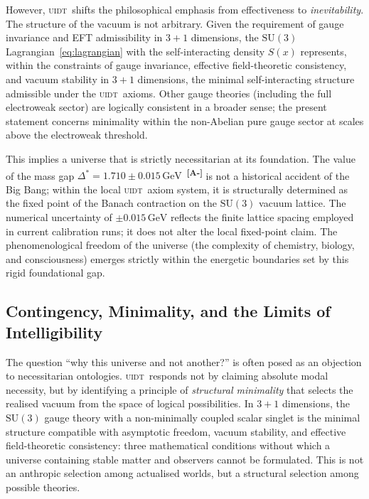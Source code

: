 \documentclass[12pt,a4paper,twoside]{article}
\theoremstyle{plain}
\theoremstyle{definition}
\theoremstyle{remark}
\newcommand{\UIDT}{\textsc{uidt}}
\newcommand{\GeV}{\,\mathrm{GeV}}
\newcommand{\catmark}[1]{\textsuperscript{\textsf{\textbf{[#1]}}}}
\newcommand{\Sx}{S(x)}
\newcommand{\DeltaGap}{1.710 \pm 0.015\GeV}        %
\begin{document}
However, \UIDT\ shifts the philosophical emphasis from effectiveness to
\emph{inevitability}. The structure of the vacuum is not arbitrary. Given the
requirement of gauge invariance and EFT admissibility in $3+1$ dimensions, the $\mathrm{SU}(3)$ Lagrangian~\eqref{eq:lagrangian} with the self-interacting
density $\Sx$ represents, within the constraints of gauge
invariance, effective field-theoretic consistency, and vacuum stability in $3+1$
dimensions, the minimal self-interacting structure admissible under the \UIDT\
axioms.  Other gauge theories (including the full electroweak sector) are
logically consistent in a broader sense; the present statement concerns
minimality within the non-Abelian pure gauge sector at scales above the
electroweak threshold.

This implies a universe that is strictly necessitarian at its foundation. The
value of the mass gap $\Delta^{*} = \DeltaGap$~\catmark{A-} is not a historical
accident of the Big Bang; within the local \UIDT\ axiom system, it is
structurally determined as the fixed point of the Banach contraction on the
$\mathrm{SU}(3)$ vacuum lattice. The numerical uncertainty of $\pm 0.015\GeV$
reflects the finite lattice spacing employed in current calibration runs; it
does not alter the local fixed-point claim.
The phenomenological freedom of the universe (the complexity of chemistry,
biology, and consciousness) emerges strictly within the energetic boundaries
set by this rigid foundational gap.

\subsection{Contingency, Minimality, and the Limits of Intelligibility}
\label{subsec:contingency}

The question ``why this universe and not another?'' is often posed as an
objection to necessitarian ontologies. \UIDT\ responds not by claiming
absolute modal necessity, but by identifying a principle of \emph{structural
minimality} that selects the realised vacuum from the space of logical
possibilities. In $3+1$ dimensions, the $\mathrm{SU}(3)$ gauge theory with a
non-minimally coupled scalar singlet is the minimal structure compatible with
asymptotic freedom, vacuum stability, and effective field-theoretic
consistency: three
mathematical conditions without which a universe containing stable matter and
observers cannot be formulated. This is not an anthropic selection among
actualised worlds, but a structural selection among possible theories.
\end{document}
